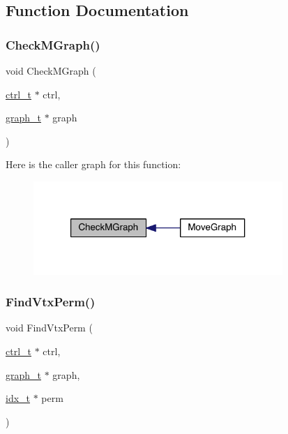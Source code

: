 \subsection{Function Documentation}
\mbox{\label{a00377_ae69f033a7361b8e9c204167082a30bca}} 
\subsubsection{\texorpdfstring{Check\+M\+Graph()}{CheckMGraph()}}
{\footnotesize\ttfamily void Check\+M\+Graph (\begin{DoxyParamCaption}\item[{\hyperlink{a00742}{ctrl\+\_\+t} $\ast$}]{ctrl,  }\item[{\hyperlink{a00734}{graph\+\_\+t} $\ast$}]{graph }\end{DoxyParamCaption})}

Here is the caller graph for this function\+:\nopagebreak
\begin{figure}[H]
\begin{center}
\leavevmode
\includegraphics[width=268pt]{a00377_ae69f033a7361b8e9c204167082a30bca_icgraph}
\end{center}
\end{figure}
\mbox{\label{a00377_a52684c6453a561953675de42a87b5d91}} 
\subsubsection{\texorpdfstring{Find\+Vtx\+Perm()}{FindVtxPerm()}}
{\footnotesize\ttfamily void Find\+Vtx\+Perm (\begin{DoxyParamCaption}\item[{\hyperlink{a00742}{ctrl\+\_\+t} $\ast$}]{ctrl,  }\item[{\hyperlink{a00734}{graph\+\_\+t} $\ast$}]{graph,  }\item[{\hyperlink{a00876_aaa5262be3e700770163401acb0150f52}{idx\+\_\+t} $\ast$}]{perm }\end{DoxyParamCaption})}

